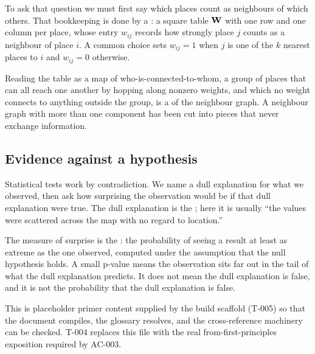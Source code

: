 To ask that question we must first say which places count as neighbours of which
others. That bookkeeping is done by a : a square table $\mathbf{W}$ with one row and one column per place,
whose entry $w_{ij}$ records how strongly place $j$ counts as a neighbour of
place $i$. A common choice sets $w_{ij}=1$ when $j$ is one of the $k$ nearest
places to $i$ and $w_{ij}=0$ otherwise.

Reading the table as a map of who-is-connected-to-whom, a group of places that
can all reach one another by hopping along nonzero weights, and which no weight
connects to anything outside the group, is a  of the neighbour graph. A neighbour graph with more than one component
has been cut into pieces that never exchange information.

\subsection{Evidence against a hypothesis}
\label{sec:primer-pvalue}

Statistical tests work by contradiction. We name a dull explanation for what we
observed, then ask how surprising the observation would be if that dull
explanation were true. The dull explanation is the
; here it is usually ``the values were
scattered across the map with no regard to location.''

The measure of surprise is the : the probability of
seeing a result at least as extreme as the one observed, computed under the
assumption that the null hypothesis holds. A small p-value means the observation
sits far out in the tail of what the dull explanation predicts. It does not mean
the dull explanation is false, and it is not the probability that the dull
explanation is false.

\begin{keyinsight}[Placeholder]
This is placeholder primer content supplied by the build scaffold (T-005) so
that the document compiles, the glossary resolves, and the cross-reference
machinery can be checked. T-004 replaces this file with the real
from-first-principles exposition required by AC-003.
\end{keyinsight}
